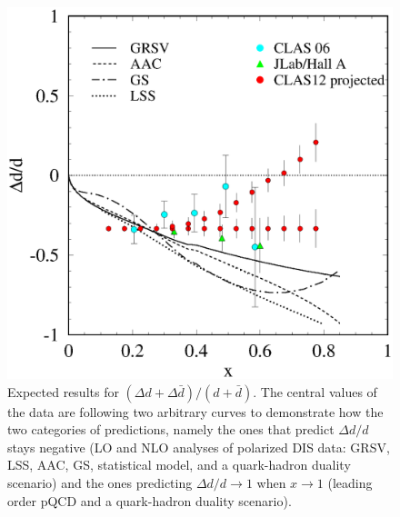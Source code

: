 \begin{figure}
\begin{center}
\begin{minipage}[t]{0.55\linewidth}
\includegraphics[scale=0.5, angle=0]{../strucfunc/ddod_xpctd.eps}
\end{minipage}\hfill
\begin{minipage}[c]{0.45\linewidth}
\vspace*{-9cm}
\caption{\small{Expected results for $(\Delta d+ \Delta\bar{d})/(d+\bar{d})$. 
The central values of the data are following two arbitrary curves to 
demonstrate how the two categories of predictions, namely the ones that 
predict $\Delta d/d$ stays negative (LO and NLO analyses of polarized 
DIS data: GRSV, LSS, AAC, GS, statistical model, and a quark-hadron duality 
scenario) and the ones predicting $\Delta d/d \to 1$ when $x \to 1$ (leading 
order pQCD and a quark-hadron duality scenario).}}
\label{fig:ddodxpctd}
\end{minipage}
\end{center}
\end{figure}

